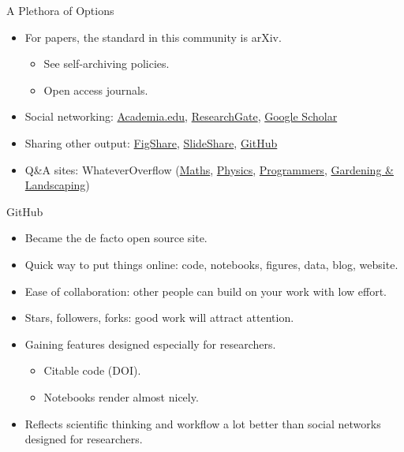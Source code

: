 \documentclass[compress,red]{beamer}\usetheme{Warsaw}\useoutertheme[subsection=false]{smoothbars}
\begin{document}
\begin{frame}{A Plethora of Options}
\begin{itemize}
\item For papers, the standard in this community is arXiv.
\begin{itemize}
  \item See self-archiving policies.
  \item Open access journals.
\end{itemize}
\item Social networking: \href{https://www.academia.edu/}{Academia.edu}, \href{https://www.researchgate.net/}{ResearchGate}, \href{http://scholar.google.com/}{Google Scholar}
\item Sharing other output: \href{http://figshare.com/}{FigShare}, \href{http://www.slideshare.net/}{SlideShare}, \href{https://github.com/}{GitHub}
\item Q\&A sites: WhateverOverflow (\href{http://mathoverflow.net/}{Maths}, \href{http://www.physicsoverflow.org/}{Physics}, \href{http://stackoverflow.com/}{Programmers}, \href{http://gardening.stackexchange.com/}{
Gardening \& Landscaping})
\end{itemize}
\end{frame}

\begin{frame}{GitHub}
\begin{itemize}

\item Became the de facto open source site.

\item Quick way to put things online: code, notebooks, figures, data, blog, website.

\item Ease of collaboration: other people can build on your work with low effort.

\item Stars, followers, forks: good work will attract attention.

\item Gaining features designed especially for researchers.
\begin{itemize}
  \item Citable code (DOI).
  \item Notebooks render almost nicely.
\end{itemize}

\item Reflects scientific thinking and workflow a lot better than social networks designed for researchers.
\end{itemize}
\end{frame}
\end{document}
